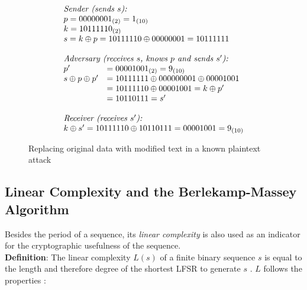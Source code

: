 \begin{figure}[htpb]
	\[\begin{array}{ll}
		\multicolumn{2}{l}{\text{\it Sender (sends $s$):}}\\
		\multicolumn{2}{l}{p = 0000 0001_{(2)} = 1_{(10)}}\\
		\multicolumn{2}{l}{k = 1011 1110_{(2)}}\\
		\multicolumn{2}{l}{s = k \oplus p = 1011 1110 \oplus 0000 0001 = 1011 1111}\\
		\\
		\multicolumn{2}{l}{\text{\it Adversary (receives $s$, knows $p$ and sends $s'$):}}\\
		p' &= 0000 1001_{(2)} = 9_{(10)}\\
		s \oplus p \oplus p' &= 1011 1111 \oplus 0000 00001 \oplus 0000 1001 \\
		&= 1011 1110 \oplus 0000 1001 = k \oplus p' \\
		&= 1011 0111 = s' \\
		\\
		\multicolumn{2}{l}{\text{\it Receiver (receives $s'$):}}\\
		\multicolumn{2}{l}{k \oplus s' = 1011 1110 \oplus 1011 0111 = 0000 1001 =  9_{(10)}}
	\end{array}\]
	\caption{Replacing original data with modified text in a known plaintext attack }
	\label{fig:text-replacment}
\end{figure}


\subsection{Linear Complexity and the Berlekamp-Massey Algorithm}

Besides the period of a sequence, its \emph{linear complexity} is also used as an indicator for the cryptographic usefulness of the sequence. \\

\textbf{Definition}: The linear complexity $L(s)$ of a finite binary sequence $s$ is equal to the length and therefore degree of the shortest LFSR to generate $s$ \cite[p. 233]{Smart.2016}. $L$ follows the properties \cite[pp. 20-21]{Cusick.2009}:\\

